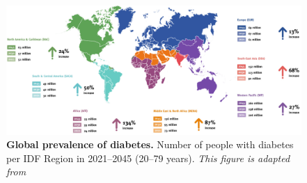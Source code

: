  \begin{figure}[H]
\centering
\includegraphics[width=\linewidth]{Chapter1/Fig/F1-3-01.png}
\caption[Global prevalence of diabetes]{\textbf{Global prevalence of diabetes.} Number of people with diabetes per IDF Region in 2021–2045 (20–79 years). \textit{This figure is adapted from \textbf{\cite{home_idf_nodate}}}}
\label{fig:chp1_idf}
\end{figure}


